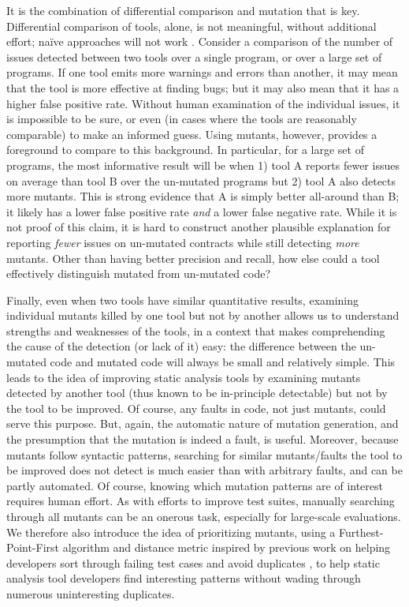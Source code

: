 It is the combination of differential comparison and mutation that is key.  Differential comparison of tools, alone, is not meaningful, without additional effort; na\"ive approaches will not work \cite{regehrRandom}.  Consider a comparison of the number of issues detected between two tools over a single program, or over a large set of programs.  If one tool emits more warnings and errors than another, it may mean that the tool is more effective at finding bugs; but it may also mean that it has a higher false positive rate.  Without human examination of the individual issues, it is impossible to be sure, or even (in cases where the tools are reasonably comparable) to make an informed guess.  Using mutants, however, provides a foreground to compare to this background.  In particular, for a large set of programs, the most informative result will be when 1) tool A reports fewer issues on average than tool B over the un-mutated programs but 2) tool A also detects more mutants.  This is strong evidence that A is simply better all-around than B; it likely has a lower false positive rate \emph{and} a lower false negative rate.  While it is not proof of this claim, it is hard to construct another plausible explanation for reporting \emph{fewer} issues on un-mutated contracts while still detecting \emph{more} mutants.  Other than having better precision and recall, how else could a tool effectively distinguish mutated from un-mutated code?

Finally, even when two tools have similar quantitative results, examining individual mutants killed by one tool but not by another allows us to understand strengths and weaknesses of the tools, in a context that makes comprehending the cause of the detection (or lack of it) easy: the difference between the un-mutated code and mutated code will always be small and relatively simple.  This leads to the idea of improving static analysis tools by examining mutants detected by another tool (thus known to be in-principle detectable) but not by the tool to be improved.  Of course, any faults in code, not just mutants, could serve this purpose.  But, again, the automatic nature of mutation generation, and the presumption that the mutation is indeed a fault, is useful.  Moreover, because mutants follow syntactic patterns, searching for similar mutants/faults the tool to be improved does not detect is much easier than with arbitrary faults, and can be partly automated.  Of course, knowing which mutation patterns are of interest requires human effort.  As with efforts to improve test suites, manually searching through all mutants can be an onerous task, especially for large-scale evaluations.  We therefore also introduce the idea of prioritizing mutants, using a Furthest-Point-First \cite{Gonzalez} algorithm and distance metric inspired by previous work on helping developers sort through failing test cases and avoid duplicates \cite{PLDI13}, to help static analysis tool developers find interesting patterns without wading through numerous uninteresting duplicates.

